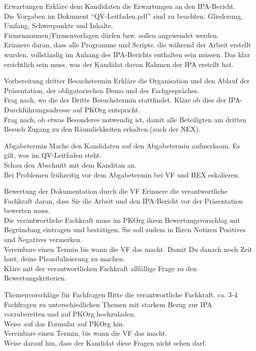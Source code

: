 \newpage
\begin{taskitem}{Erwartungen}
  Erkläre dem Kandidaten die Erwartungen an den IPA-Bericht.\\Die Vorgaben im Dokument \enquote{QV-Leitfaden.pdf} sind zu beachten. Gliederung, Umfang, Schwerpunkte und Inhalte.\\Firmennormen/Firmenvorlagen dürfen bzw. sollen angewendet werden.\\Erinnere daran, dass alle Programme und Scripts, die während der Arbeit erstellt wurden, vollständig im Anhang des IPA-Berichts enthalten sein müssen. Das klar ersichtlich sein muss, was der Kandidat davon Rahmen der IPA erstellt hat.
\end{taskitem}
\begin{taskitem}{Vorbereitung dritter Besuchstermin}
  Erkläre die Organisation und den Ablauf der Präsentation, der obligatorischen Demo und des Fachgespräches.\\Frag nach, wo die der Dritte Besuchstermin stattfindet. Kläre ob dies der IPA-Durchführungsadresse auf PKOrg entspricht.\\Frag nach, ob etwas Besonderes notwendig ist, damit alle Beteiligten am dritten Besuch Zugang zu den Räumlichkeiten erhalten.(auch der NEX).
\end{taskitem}
\begin{taskitem}{Abgabetermin}
  Mache den Kandidaten auf den Abgabetermin aufmerksam. Es gilt, was im QV-Leitfaden steht.\\Schau den Abschnitt mit dem Kanditan an.\\Bei Problemen frühzeitig vor dem Abgabetermin bei VF und HEX eskalieren. 
\end{taskitem}
\newpage
\begin{taskitem}{Bewertung der Dokumentation durch die VF}
  Erinnere die verantwortliche Fachkraft daran, dass Sie die Arbeit und den IPA-Bericht vor der Präsentation bewerten muss.\\Die verantwortliche Fachkraft muss im PKOrg ihren Bewertungsvorschlag mit Begründung eintragen und bestätigen. Sie soll zudem in Ihren Notizen Positives und Negatives vermerken.\\Vereinbare einen Termin bis wann die VF das macht. Damit Du danach noch Zeit hast, deine Plausibilisierung zu machen.\\Kläre mit der verantwortlichen Fachkraft allfällige Frage zu den Bewertungskriterien. 
\end{taskitem}
\begin{taskitem}{Themenvorschläge für Fachfragen}
  Bitte die verantwortliche Fachkraft, ca. 3-4 Fachfragen zu unterschiedlichen Themen mit starkem Bezug zur IPA vorzubereiten und auf PKOrg hochzuladen.\\Weise auf das Formular auf PKOrg hin.\\Vereinbare einen Termin, bis wann die VF das macht.\\Weise darauf hin, dass der Kandidat diese Fragen nicht sehen darf.
\end{taskitem}
